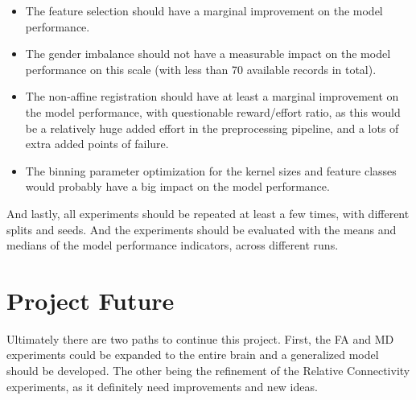 \begin{itemize}
  \item The feature selection should have a marginal improvement on the model performance.
  \item The gender imbalance should not have a measurable impact on the model performance on this scale (with less than 70 available records in total).
  \item The non-affine registration should have at least a marginal improvement on the model performance, with questionable reward/effort ratio, as this would be a relatively huge added effort in the preprocessing pipeline, and a lots of extra added points of failure.
  \item The binning parameter optimization for the kernel sizes and feature classes would probably have a big impact on the model performance.
\end{itemize}
And lastly, all experiments should be repeated at least a few times, with different splits and seeds. And the experiments should be evaluated with the means and medians of the model performance indicators, across different runs.

\section{Project Future}

Ultimately there are two paths to continue this project. First, the \ac{FA} and \ac{MD} experiments could be expanded to the entire brain and a generalized model should be developed. The other being the refinement of the Relative Connectivity experiments, as it definitely need improvements and new ideas.



